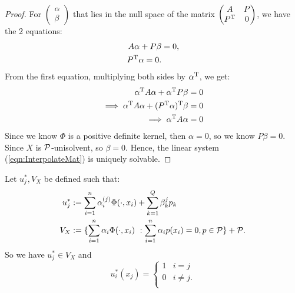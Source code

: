 \documentclass[twoside]{memoir}
\begin{document}
\begin{proof}
	For $\begin{pmatrix}
	\alpha \\ \beta
	\end{pmatrix}$ that lies in the null space of the matrix
	$\begin{pmatrix}
	A & P \\
	P^{\text{T}} & 0 \\
	\end{pmatrix}$, we have the 2 equations:
	\begin{equation*}
	\begin{split}
	A \alpha + P \beta &= 0,\\
	P^{\text{T}} \alpha = 0. \\
	\end{split}
	\end{equation*}
	From the first equation, multiplying both sides by $\alpha^{\text{T}}$, we get:
	\begin{equation*}
	\begin{split}
	\alpha^{\text{T}} A \alpha + \alpha^{\text{T}} P \beta &= 0\\
	\implies \alpha^{\text{T}} A \alpha + (P^{\text{T}} \alpha)^{\text{T}} \beta &= 0\\
	\implies \alpha^{\text{T}} A \alpha &= 0\\
	\end{split}
	\end{equation*}
	Since we know $\Phi$ is a positive definite kernel, then $\alpha = 0$, so we know $P \beta = 0$. Since $X$ is $\mathcal{P}$-unisolvent, so $\beta = 0$. Hence, the linear system (\ref{eqn:InterpolateMat}) is uniquely solvable.
\end{proof}
Let $u_j^*, V_X$ be defined such that:
\begin{equation}
\begin{split}
u_j^* &:= \sum_{i=1}^{n} \alpha_i^{(j)} \Phi(\cdot, x_i) + \sum_{k=1}^{Q} \beta_k^{j} p_k \label{eq:ustar}\\
V_X &:= \{ \sum_{i=1}^{n} \alpha_i \Phi(\cdot, x_i) ~ : \sum_{i=1}^{n} \alpha_i p(x_i) = 0, p \in \mathcal{P}  \} + \mathcal{P}.
\end{split}
\end{equation}
So we have $u_j^* \in V_X$ and \[ u_i^*(x_j) =  \begin{cases} 
1 & i=j \\
0 & i \neq j.\\
\end{cases}
\]
\end{document}
